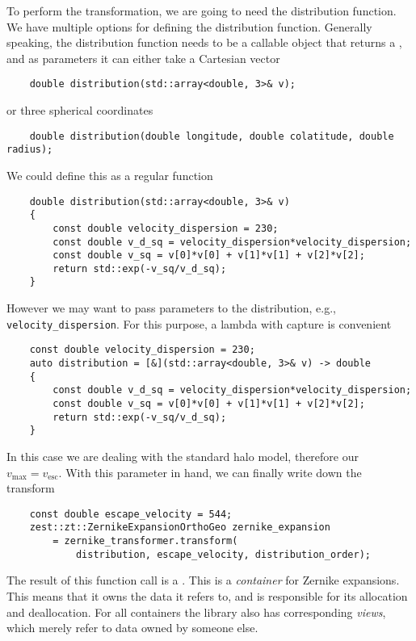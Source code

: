 \documentclass{article}
\begin{document}
To perform the transformation, we are going to need the distribution function. We have multiple options for defining the distribution function. Generally speaking, the distribution function needs to be a callable object that returns a , and as parameters it can either take a Cartesian vector
\begin{verbatim}
    double distribution(std::array<double, 3>& v);
\end{verbatim}
or three spherical coordinates
\begin{verbatim}
    double distribution(double longitude, double colatitude, double radius);
\end{verbatim}
We could define this as a regular function
\begin{verbatim}
    double distribution(std::array<double, 3>& v)
    {
        const double velocity_dispersion = 230;
        const double v_d_sq = velocity_dispersion*velocity_dispersion;
        const double v_sq = v[0]*v[0] + v[1]*v[1] + v[2]*v[2];
        return std::exp(-v_sq/v_d_sq);
    }
\end{verbatim}
However we may want to pass parameters to the distribution, e.g., \texttt{velocity\_dispersion}. For this purpose, a lambda with capture is convenient
\begin{verbatim}
    const double velocity_dispersion = 230;
    auto distribution = [&](std::array<double, 3>& v) -> double
    {
        const double v_d_sq = velocity_dispersion*velocity_dispersion;
        const double v_sq = v[0]*v[0] + v[1]*v[1] + v[2]*v[2];
        return std::exp(-v_sq/v_d_sq);
    }
\end{verbatim}

In this case we are dealing with the standard halo model, therefore our $v_\text{max}=v_\text{esc}$. With this parameter in hand, we can finally write down the transform
\begin{verbatim}
    const double escape_velocity = 544;
    zest::zt::ZernikeExpansionOrthoGeo zernike_expansion
        = zernike_transformer.transform(
            distribution, escape_velocity, distribution_order);
\end{verbatim}
The result of this function call is a . This is a \emph{container} for Zernike expansions. This means that it owns the data it refers to, and is responsible for its allocation and deallocation. For all containers the library also has corresponding \emph{views}, which merely refer to data owned by someone else.
\end{document}
